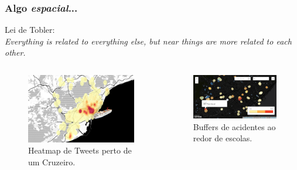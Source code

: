 \documentclass[hyperref={pdfpagelabels=true}]{beamer}
\begin{document}
\begin{frame}
\frametitle{Algo \textit{espacial}...}

Lei de Tobler:\\
\textit{Everything is related to everything else, but near things are more related to each other.}%

\begin{columns}
  \begin{column}{0.4\textwidth}
    \begin{figure}  
	\includegraphics[width=\textwidth]{cruise.png}\\
           \tiny{Heatmap de Tweets perto de um Cruzeiro.}%
       \end{figure}             
  \end{column}
  \begin{column}{0.6\textwidth}
      \begin{figure}  
	\includegraphics[width=\textwidth]{schools.png}\\
           \tiny{Buffers de acidentes ao redor de escolas.}%
       \end{figure}  
  \end{column}  
\end{columns}

\end{frame}
\end{document}
